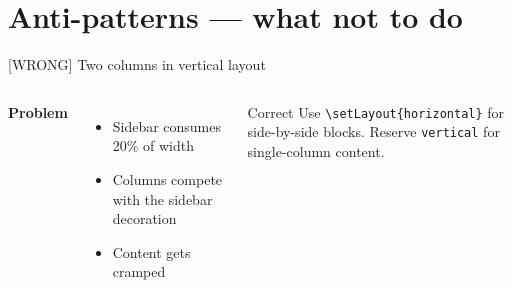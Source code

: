 \documentclass[aspectratio=169,t,xcolor=table]{beamer}
\begin{document}
\section[DarkOrange]{Anti-patterns — what not to do}

\begin{frame}{[WRONG] Two columns in vertical layout}

    \begin{columns}
        \textbf{Problem}
        \begin{itemize}
            \item Sidebar consumes 20\% of width
            \item Columns compete with the sidebar decoration
            \item Content gets cramped
        \end{itemize}

        \begin{alertblock}{Correct}
            Use \texttt{\textbackslash setLayout\{horizontal\}} for side-by-side blocks.
            Reserve \texttt{vertical} for single-column content.
        \end{alertblock}
    \end{columns}

\end{frame}
\end{document}
